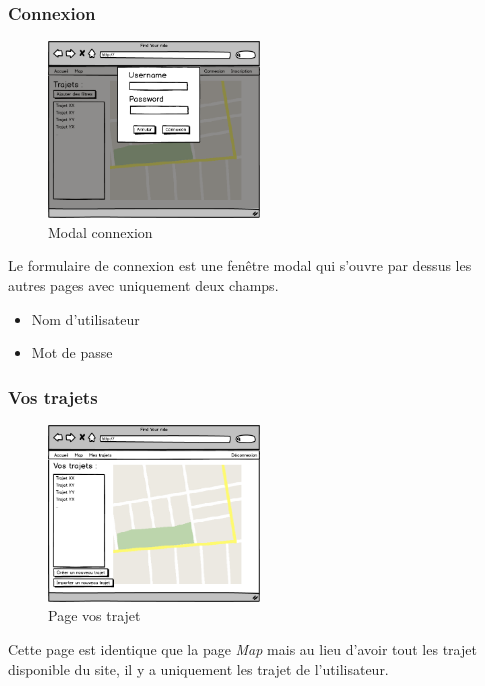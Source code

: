 \documentclass[a4paper]{article}
\begin{document}
\subsubsection{Connexion}
\begin{figure}[h]
\centering
\includegraphics[width=0.5\textwidth]{./Images/Interfaces/Connexin.png}
\caption{Modal connexion}
\end{figure}

Le formulaire de connexion est une fenêtre modal qui s'ouvre par dessus les autres pages avec uniquement deux champs.
\begin{itemize}
    \item Nom d'utilisateur
    \item Mot de passe
\end{itemize}


\subsubsection{Vos trajets}
\begin{figure}[h]
\centering
\includegraphics[width=0.5\textwidth]{./Images/Interfaces/VosTrajets.png}
\caption{Page vos trajet}
\end{figure}

Cette page est identique que la page \emph{Map} mais au lieu d'avoir tout les trajet disponible du site, il y a uniquement les trajet de l'utilisateur.
\end{document}
